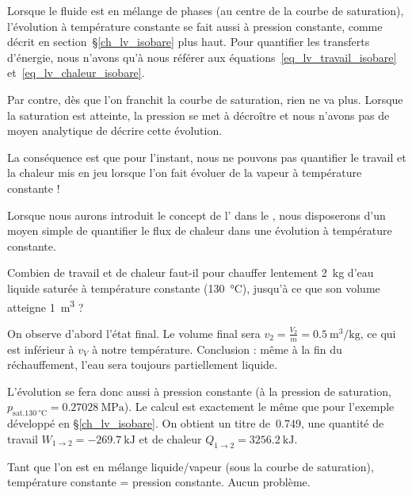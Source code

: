 		Lorsque le fluide est en mélange de phases (au centre de la courbe de saturation), l’évolution à température constante se fait aussi à pression constante, comme décrit en section~\S\ref{ch_lv_isobare} plus haut. Pour quantifier les transferts d’énergie, nous n’avons qu’à nous référer aux équations~\ref{eq_lv_travail_isobare} et~\ref{eq_lv_chaleur_isobare}.

		Par contre, dès que l’on franchit la courbe de saturation, rien ne va plus. Lorsque la saturation est atteinte, la pression se met à décroître et nous n’avons pas de moyen analytique de décrire cette évolution.
		
		La conséquence est que pour l’instant, nous ne pouvons pas quantifier le travail et la chaleur mis en jeu lorsque l’on fait évoluer de la vapeur à température constante !

		Lorsque nous aurons introduit le concept de l’ dans le \courshuitshort, nous disposerons d’un moyen simple de quantifier le flux de chaleur dans une évolution à température constante.
		
			\begin{anexample}
				\label{ch_exemple_isotherme_lv_un}
			
			Combien de travail et de chaleur faut-il pour chauffer lentement \SI{2}{\kilogram} d’eau liquide saturée à température constante (\SI{130}{\degreeCelsius}), jusqu’à ce que son volume atteigne \SI{1}{\metre\cubed} ?
			
				\begin{answer}
				On observe d’abord l’état final. Le volume final sera $v_2 = \frac{V_2}{m} = \SI{0,5}{\metre\cubed\per\kilogram} $, ce qui est inférieur à $v_V$ à notre température. Conclusion : même à la fin du réchauffement, l’eau sera toujours partiellement liquide.
				
				L’évolution se fera donc aussi à pression constante (à la pression de saturation, $p_{\text{sat.} \SI{130}{\degreeCelsius}} = \SI{0,27028}{\mega\pascal} $). Le calcul est exactement le même que pour l’exemple développé en \S\ref{ch_lv_isobare}. On obtient un titre de~\num{0,749}, une quantité de travail $W_{1\to2} = \SI{-269,7}{\kilo\joule}$ et de chaleur $Q_{1\to2} = \SI{+3256,2}{\kilo\joule}$.				
				
				\begin{remark}Tant que l’on est en mélange liquide/vapeur (sous la courbe de saturation), température constante = pression constante. Aucun problème.\end{remark}\end{answer}
			\end{anexample}
			

